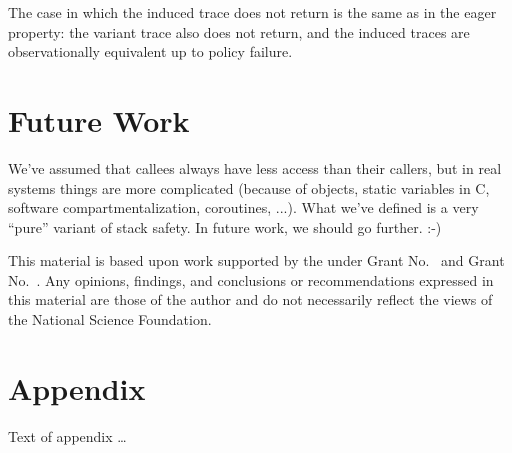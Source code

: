 \documentclass[acmsmall,review,anonymous]{acmart}\settopmatter{printfolios=true,printccs=false,printacmref=false}
\begin{document}
      The case in which the induced trace does not return is the same as in the
      eager property: the variant trace also does not return, and the induced
      traces are observationally equivalent up to policy failure.

\section{Future Work}

We've assumed that callees always have less access than their callers, but
in real systems things are more complicated (because of objects, static
variables in C, software compartmentalization, coroutines, ...).  What we've
defined is a very ``pure'' variant of stack safety.  In future work, we
should go further. :-)


\begin{acks}                            %
  This material is based upon work supported by the
   under Grant
  No.~ and Grant
  No.~.  Any opinions, findings, and
  conclusions or recommendations expressed in this material are those
  of the author and do not necessarily reflect the views of the
  National Science Foundation.
\end{acks}


%


\appendix
\section{Appendix}

Text of appendix \ldots
\end{document}
